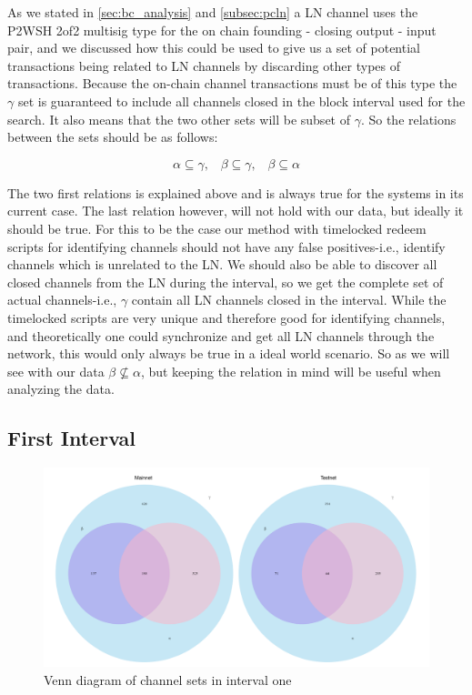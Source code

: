 As we stated in \cref{sec:bc_analysis} and \cref{subsec:pcln} a LN channel uses the P2WSH 2of2 multisig type for the on chain founding - closing output - input pair, and we discussed how this could be used to give us a set of potential transactions being related to LN channels by discarding other types of transactions. Because the on-chain channel transactions must be of this type the \( \gamma \) set is guaranteed to include all channels closed in the block interval used for the search. It also means that the two other sets will be subset of \( \gamma \). So the relations between the sets should be as follows:

\begin{equation} \label{eq:1}
      \alpha \subseteq \gamma, \hspace{10pt} \beta \subseteq \gamma, \hspace{10pt} \beta \subseteq \alpha  
\end{equation}

The two first relations is explained above and is always true for the systems in its current case. The last relation however, will not hold with our data, but ideally it should be true. For this to be the case our method with timelocked redeem scripts for identifying channels should not have any false positives-i.e., identify channels which is unrelated to the LN. We should also be able to discover all closed channels from the LN during the interval, so we get the complete set of actual channels-i.e., \( \gamma \) contain all LN channels closed in the interval. While the timelocked scripts are very unique and therefore good for identifying channels, and theoretically one could synchronize and get all LN channels through the network, this would only always be true in a ideal world scenario. So as we will see with our data \( \beta \not\subseteq \alpha \), but keeping the relation in mind will be useful when analyzing the data.

\subsection{First Interval}

\begin{figure}[h]
    \centering
    \includegraphics[width=16cm]{figures/graphs/venn_full1.png}
    \caption{Venn diagram of channel sets in interval one}
    \label{fig:venn_run1}
\end{figure}

